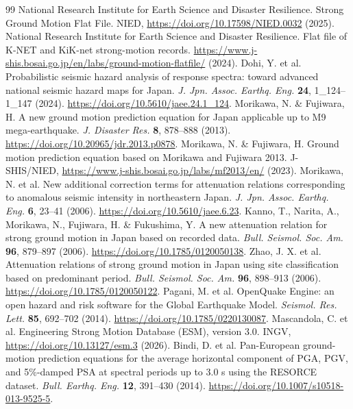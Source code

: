 \documentclass[10pt]{article}
\begin{document}
\renewcommand{\refname}{Supplementary References}
\small
\begin{thebibliography}{99}
 National Research Institute for Earth Science and Disaster Resilience. Strong Ground Motion Flat File. NIED, \url{https://doi.org/10.17598/NIED.0032} (2025).
 National Research Institute for Earth Science and Disaster Resilience. Flat file of K-NET and KiK-net strong-motion records. \url{https://www.j-shis.bosai.go.jp/en/labs/ground-motion-flatfile/} (2024).
 Dohi, Y. et al. Probabilistic seismic hazard analysis of response spectra: toward advanced national seismic hazard maps for Japan. \textit{J. Jpn. Assoc. Earthq. Eng.} \textbf{24}, 1\_124--1\_147 (2024). \url{https://doi.org/10.5610/jaee.24.1_124}.
 Morikawa, N. \& Fujiwara, H. A new ground motion prediction equation for Japan applicable up to M9 mega-earthquake. \textit{J. Disaster Res.} \textbf{8}, 878--888 (2013). \url{https://doi.org/10.20965/jdr.2013.p0878}.
 Morikawa, N. \& Fujiwara, H. Ground motion prediction equation based on Morikawa and Fujiwara 2013. J-SHIS/NIED, \url{https://www.j-shis.bosai.go.jp/labs/mf2013/en/} (2023).
 Morikawa, N. et al. New additional correction terms for attenuation relations corresponding to anomalous seismic intensity in northeastern Japan. \textit{J. Jpn. Assoc. Earthq. Eng.} \textbf{6}, 23--41 (2006). \url{https://doi.org/10.5610/jaee.6.23}.
 Kanno, T., Narita, A., Morikawa, N., Fujiwara, H. \& Fukushima, Y. A new attenuation relation for strong ground motion in Japan based on recorded data. \textit{Bull. Seismol. Soc. Am.} \textbf{96}, 879--897 (2006). \url{https://doi.org/10.1785/0120050138}.
 Zhao, J. X. et al. Attenuation relations of strong ground motion in Japan using site classification based on predominant period. \textit{Bull. Seismol. Soc. Am.} \textbf{96}, 898--913 (2006). \url{https://doi.org/10.1785/0120050122}.
 Pagani, M. et al. OpenQuake Engine: an open hazard and risk software for the Global Earthquake Model. \textit{Seismol. Res. Lett.} \textbf{85}, 692--702 (2014). \url{https://doi.org/10.1785/0220130087}.
 Mascandola, C. et al. Engineering Strong Motion Database (ESM), version 3.0. INGV, \url{https://doi.org/10.13127/esm.3} (2026).
 Bindi, D. et al. Pan-European ground-motion prediction equations for the average horizontal component of PGA, PGV, and 5\%-damped PSA at spectral periods up to 3.0 s using the RESORCE dataset. \textit{Bull. Earthq. Eng.} \textbf{12}, 391--430 (2014). \url{https://doi.org/10.1007/s10518-013-9525-5}.

\end{thebibliography}
\end{document}

